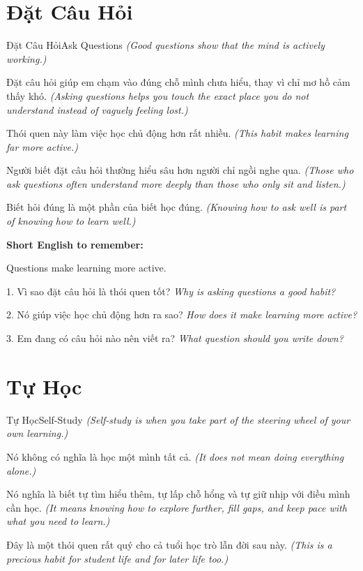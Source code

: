 \section{Đặt Câu Hỏi}
\begin{truyen}{Đặt Câu Hỏi}{Ask Questions}
\textit{(Good questions show that the mind is actively working.)}

Đặt câu hỏi giúp em chạm vào đúng chỗ mình chưa hiểu, thay vì chỉ mơ hồ cảm thấy khó.
\textit{(Asking questions helps you touch the exact place you do not understand instead of vaguely feeling lost.)}

Thói quen này làm việc học chủ động hơn rất nhiều.
\textit{(This habit makes learning far more active.)}

Người biết đặt câu hỏi thường hiểu sâu hơn người chỉ ngồi nghe qua.
\textit{(Those who ask questions often understand more deeply than those who only sit and listen.)}
\end{truyen}

\begin{baihoc}
Biết hỏi đúng là một phần của biết học đúng.
\textit{(Knowing how to ask well is part of knowing how to learn well.)}
\end{baihoc}

\begin{ghinhoanh}
\textbf{Short English to remember:}

Questions make learning more active.

\end{ghinhoanh}

\begin{tuhocnhanh}
1. Vì sao đặt câu hỏi là thói quen tốt? \textit{Why is asking questions a good habit?}

2. Nó giúp việc học chủ động hơn ra sao? \textit{How does it make learning more active?}

3. Em đang có câu hỏi nào nên viết ra? \textit{What question should you write down?}
\end{tuhocnhanh}
\ngancach

\section{Tự Học}
\begin{truyen}{Tự Học}{Self-Study}
\textit{(Self-study is when you take part of the steering wheel of your own learning.)}

Nó không có nghĩa là học một mình tất cả.
\textit{(It does not mean doing everything alone.)}

Nó nghĩa là biết tự tìm hiểu thêm, tự lấp chỗ hổng và tự giữ nhịp với điều mình cần học.
\textit{(It means knowing how to explore further, fill gaps, and keep pace with what you need to learn.)}

Đây là một thói quen rất quý cho cả tuổi học trò lẫn đời sau này.
\textit{(This is a precious habit for student life and for later life too.)}
\end{truyen}


